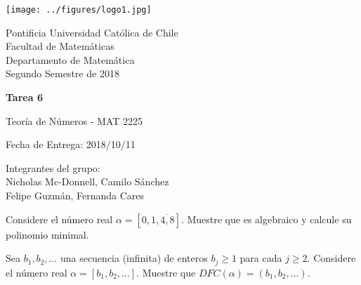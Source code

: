 


\begin{minipage}{2.5cm}
	\texttt{[image: ../figures/logo1.jpg]}
\end{minipage}
\begin{minipage}{13cm}
	\begin{flushleft}
		\raggedright
		{
			\noindent
			{\sc Pontificia Universidad Católica de Chile\\
				Facultad de Matemáticas\\
				Departamento de Matemática} \smallskip \\
			Segundo Semestre de 2018\\
		}
	\end{flushleft}
\end{minipage}

\vspace{2ex}
{\Large \centerline{\bf Tarea 6}}
{\large \centerline{Teoría de Números - MAT 2225}}
\centerline{Fecha de Entrega: 2018/10/11}

\begin{flushright}
	Integrantes del grupo:\\
	Nicholas Mc-Donnell, Camilo Sánchez\\
	Felipe Guzmán, Fernanda Cares
\end{flushright}

\begin{prob}[5 pts.]
	Considere el número real $\alpha=[0,1,\overline{4,8}]$. Muestre que es algebraico y calcule su polinomio minimal.
\end{prob}

\begin{sol}

\end{sol}

\begin{prob}[5 pts.]
	Sea $b_1,b_2,...$ una secuencia (infinita) de enteros $b_j\geq1$ para cada $j\geq2$. Considere el número real $\alpha=[b_1,b_2,...]$. Muestre que $DFC(\alpha)=(b_1,b_2,...)$.
\end{prob}

